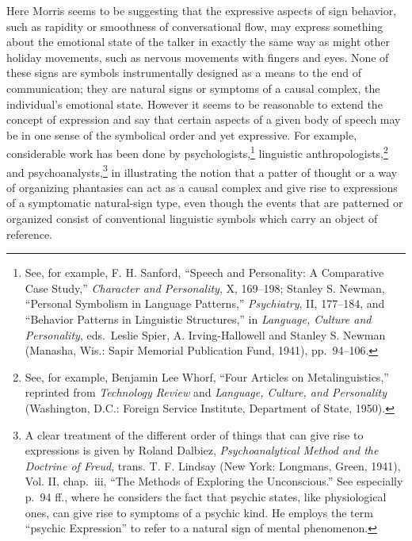\documentclass[openany,nobib]{tufte-book}
\begin{document}
\noindent Here Morris seems to be suggesting that the expressive aspects of sign
behavior, such as rapidity or smoothness of conversational flow, may
express something about the emotional state of the talker in exactly the
same way as might other holiday movements, such as nervous movements
with fingers and eyes. None of these signs are symbols instrumentally
designed as a means to the end of communication; they are natural signs
or symptoms of a causal complex, the individual's emotional state.
However it seems to be reasonable to extend the concept of expression
and say that certain aspects of a given body of speech may be in one
sense of the symbolical order and yet expressive. For example,
considerable work has been done by psychologists,\footnote{See, for
  example, F. H. Sanford, ``Speech and Personality: A Comparative Case
  Study,'' \emph{Character and Personality}, X, 169--198; Stanley S.
  Newman, ``Personal Symbolism in Language Patterns,''
  \emph{Psychiatry}, II, 177--184, and ``Behavior Patterns in Linguistic
  Structures,'' in \emph{Language, Culture and Personality}, eds.~Leslie
  Spier, A. Irving-Hallowell and Stanley S. Newman (Manasha, Wis.: Sapir
  Memorial Publication Fund, 1941), pp.~94--106.} linguistic
anthropologists,\footnote{See, for example, Benjamin Lee Whorf, ``Four
  Articles on Metalinguistics,'' reprinted from \emph{Technology Review}
  and \emph{Language, Culture, and Personality} (Washington, D.C.:
  Foreign Service Institute, Department of State, 1950).} and
psychoanalysts,\footnote{A clear treatment of the different order of
  things that can give rise to expressions is given by Roland Dalbiez,
  \emph{Psychoanalytical Method and the Doctrine of Freud}, trans. T. F.
  Lindsay (New York: Longmans, Green, 1941), Vol. II, chap.~iii, ``The
  Methods of Exploring the Unconscious.'' See especially p.~94 ff.,
  where he considers the fact that psychic states, like physiological
  ones, can give rise to symptoms of a psychic kind. He employs the term
  ``psychic Expression'' to refer to a natural sign of mental
  phenomenon.} in illustrating the notion that a patter of thought or a
way of organizing phantasies can act as a causal complex and give rise
to expressions of a symptomatic natural-sign type, even though the
events that are patterned or organized consist of conventional
linguistic symbols which carry an object of reference.
\end{document}
